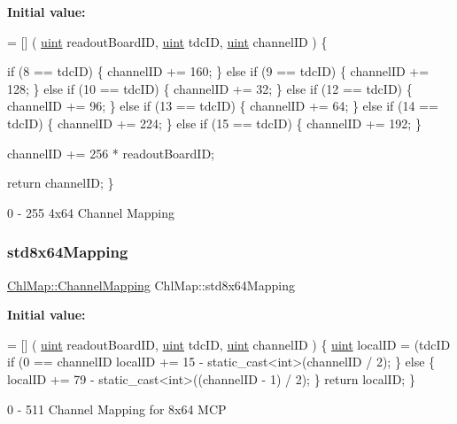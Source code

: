 {\bfseries Initial value\+:}
\begin{DoxyCode}
= [] (
    \hyperlink{_channel_mappings_8cpp_a69aa29b598b851b0640aa225a9e5d61d}{uint} readoutBoardID,
    \hyperlink{_channel_mappings_8cpp_a69aa29b598b851b0640aa225a9e5d61d}{uint} tdcID,
    \hyperlink{_channel_mappings_8cpp_a69aa29b598b851b0640aa225a9e5d61d}{uint} channelID
) \{
    
    
    \textcolor{keywordflow}{if} (8 == tdcID) \{
        channelID += 160;
    \} \textcolor{keywordflow}{else} \textcolor{keywordflow}{if} (9 == tdcID) \{
        channelID += 128;
    \} \textcolor{keywordflow}{else} \textcolor{keywordflow}{if} (10 == tdcID) \{
        channelID += 32;
    \} \textcolor{keywordflow}{else} \textcolor{keywordflow}{if} (12 == tdcID) \{
        channelID += 96;
    \} \textcolor{keywordflow}{else} \textcolor{keywordflow}{if} (13 == tdcID) \{
        channelID += 64;
    \} \textcolor{keywordflow}{else} \textcolor{keywordflow}{if} (14 == tdcID) \{
        channelID += 224;
    \} \textcolor{keywordflow}{else} \textcolor{keywordflow}{if} (15 == tdcID) \{
        channelID += 192;
    \}

    channelID += 256 * readoutBoardID;

    \textcolor{keywordflow}{return} channelID;
\}
\end{DoxyCode}


0 -\/ 255 4x64 Channel Mapping 

\mbox{\label{namespace_chl_map_a615e236287cdfca8b2521b4280e3c972}} 
\subsubsection{\texorpdfstring{std8x64\+Mapping}{std8x64Mapping}}
{\footnotesize\ttfamily \hyperlink{namespace_chl_map_a02f93d10e11f82c0ea2330212cf70545}{Chl\+Map\+::\+Channel\+Mapping} Chl\+Map\+::std8x64\+Mapping}

{\bfseries Initial value\+:}
\begin{DoxyCode}
= [] (
    \hyperlink{_channel_mappings_8cpp_a69aa29b598b851b0640aa225a9e5d61d}{uint} readoutBoardID,
    \hyperlink{_channel_mappings_8cpp_a69aa29b598b851b0640aa225a9e5d61d}{uint} tdcID,
    \hyperlink{_channel_mappings_8cpp_a69aa29b598b851b0640aa225a9e5d61d}{uint} channelID
) \{
    \hyperlink{_channel_mappings_8cpp_a69aa29b598b851b0640aa225a9e5d61d}{uint} localID = (tdcID%
    \textcolor{keywordflow}{if} (0 == channelID%
        localID += 15 - \textcolor{keyword}{static\_cast<}\textcolor{keywordtype}{int}\textcolor{keyword}{>}(channelID / 2); 
    \} \textcolor{keywordflow}{else} \{
        localID += 79 - \textcolor{keyword}{static\_cast<}\textcolor{keywordtype}{int}\textcolor{keyword}{>}((channelID - 1) / 2); 
    \}
    \textcolor{keywordflow}{return} localID;
\}
\end{DoxyCode}


0 -\/ 511 Channel Mapping for 8x64 M\+CP 


